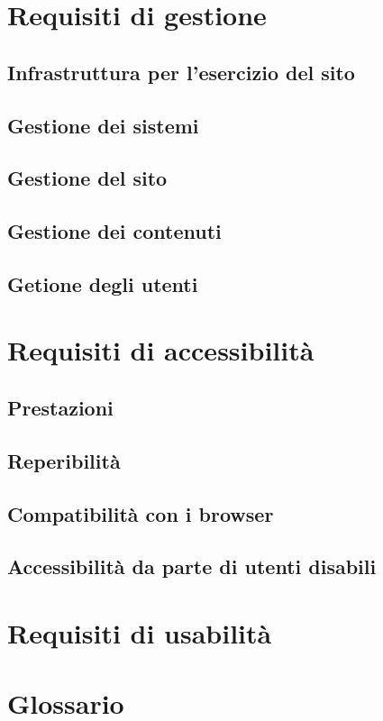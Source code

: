 \documentclass[a4paper,12pt,hidelinks]{report}
\begin{document}
\section{Requisiti di gestione}
	\subsection{Infrastruttura per l'esercizio del sito}
	\subsection{Gestione dei sistemi}
	\subsection{Gestione del sito}
	\subsection{Gestione dei contenuti}
	\subsection{Getione degli utenti}

\section{Requisiti di accessibilità}
	\subsection{Prestazioni}
	\subsection{Reperibilità}
	\subsection{Compatibilità con i browser}
	\subsection{Accessibilità da parte di utenti disabili}

\section{Requisiti di usabilità}

\section{Glossario}
\end{document}
